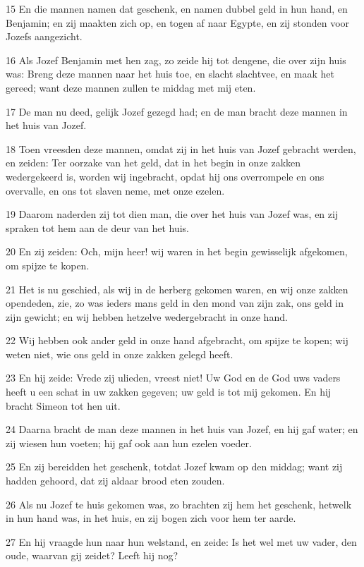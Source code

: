 \par 15 En die mannen namen dat geschenk, en namen dubbel geld in hun hand, en Benjamin; en zij maakten zich op, en togen af naar Egypte, en zij stonden voor Jozefs aangezicht.
\par 16 Als Jozef Benjamin met hen zag, zo zeide hij tot dengene, die over zijn huis was: Breng deze mannen naar het huis toe, en slacht slachtvee, en maak het gereed; want deze mannen zullen te middag met mij eten.
\par 17 De man nu deed, gelijk Jozef gezegd had; en de man bracht deze mannen in het huis van Jozef.
\par 18 Toen vreesden deze mannen, omdat zij in het huis van Jozef gebracht werden, en zeiden: Ter oorzake van het geld, dat in het begin in onze zakken wedergekeerd is, worden wij ingebracht, opdat hij ons overrompele en ons overvalle, en ons tot slaven neme, met onze ezelen.
\par 19 Daarom naderden zij tot dien man, die over het huis van Jozef was, en zij spraken tot hem aan de deur van het huis.
\par 20 En zij zeiden: Och, mijn heer! wij waren in het begin gewisselijk afgekomen, om spijze te kopen.
\par 21 Het is nu geschied, als wij in de herberg gekomen waren, en wij onze zakken opendeden, zie, zo was ieders mans geld in den mond van zijn zak, ons geld in zijn gewicht; en wij hebben hetzelve wedergebracht in onze hand.
\par 22 Wij hebben ook ander geld in onze hand afgebracht, om spijze te kopen; wij weten niet, wie ons geld in onze zakken gelegd heeft.
\par 23 En hij zeide: Vrede zij ulieden, vreest niet! Uw God en de God uws vaders heeft u een schat in uw zakken gegeven; uw geld is tot mij gekomen. En hij bracht Simeon tot hen uit.
\par 24 Daarna bracht de man deze mannen in het huis van Jozef, en hij gaf water; en zij wiesen hun voeten; hij gaf ook aan hun ezelen voeder.
\par 25 En zij bereidden het geschenk, totdat Jozef kwam op den middag; want zij hadden gehoord, dat zij aldaar brood eten zouden.
\par 26 Als nu Jozef te huis gekomen was, zo brachten zij hem het geschenk, hetwelk in hun hand was, in het huis, en zij bogen zich voor hem ter aarde.
\par 27 En hij vraagde hun naar hun welstand, en zeide: Is het wel met uw vader, den oude, waarvan gij zeidet? Leeft hij nog?
